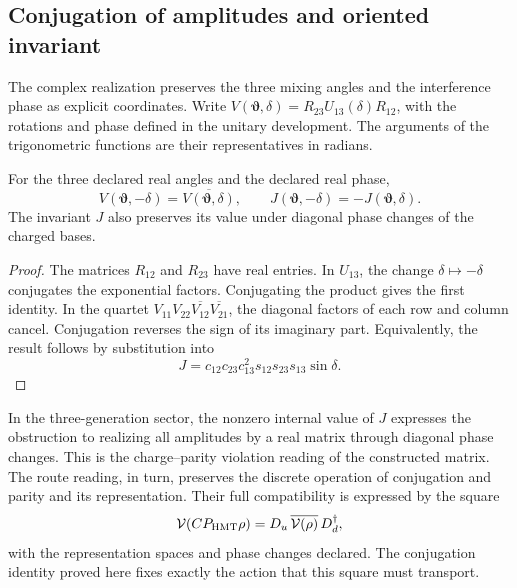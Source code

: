 \subsection{Conjugation of amplitudes and oriented invariant}
\label{sec:ii09-conjugacion-amplitudes}

The complex realization preserves the three mixing angles and
the interference phase as explicit coordinates. Write
\(V(\boldsymbol\vartheta,\delta)
=R_{23}U_{13}(\delta)R_{12}\), with the rotations and phase
defined in the unitary development. The arguments of the
trigonometric functions are their representatives in radians.

\begin{proposition}
\label{prop:ii09-conjugacion-unitaria}
For the three declared real angles and the declared real phase,
\[
 V(\boldsymbol\vartheta,-\delta)
       =\overline{V(\boldsymbol\vartheta,\delta)},
 \qquad
 J(\boldsymbol\vartheta,-\delta)
       =-J(\boldsymbol\vartheta,\delta).
\]
The invariant \(J\) also preserves its value under diagonal
phase changes of the charged bases.
\end{proposition}
\begin{proof}
The matrices \(R_{12}\) and \(R_{23}\) have real entries.
In \(U_{13}\), the change \(\delta\mapsto-\delta\) conjugates
the exponential factors. Conjugating the product gives the
first identity. In the quartet
\(V_{11}V_{22}\overline{V_{12}}\overline{V_{21}}\), the
diagonal factors of each row and column cancel. Conjugation
reverses the sign of its imaginary part. Equivalently, the
result follows by substitution into
\[
 J=c_{12}c_{23}c_{13}^{2}s_{12}s_{23}s_{13}\sin\delta.
\]
\end{proof}

In the three-generation sector, the nonzero internal value of
\(J\) expresses the obstruction to realizing all amplitudes
by a real matrix through diagonal phase changes. This
is the charge--parity violation reading of the constructed
matrix. The route reading, in turn, preserves the discrete
operation of conjugation and parity and its representation. Their
full compatibility is expressed by the square
\[
 \mathcal V(CP_{\rm HMT}\rho)
  =D_u\,\overline{\mathcal V(\rho)}\,D_d^{\dagger},
\]
with the representation spaces and phase changes
declared. The conjugation identity proved here fixes
exactly the action that this square must transport.
